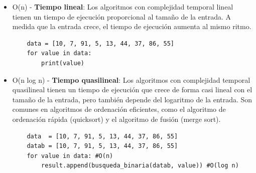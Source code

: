 \documentclass[xcolor=table]{beamer}
\begin{document}
\begin{frame} [fragile] \footnotesize  
    
 \begin{itemize}   

   
       
    \item O(n) - \textbf{Tiempo lineal}: Los algoritmos con complejidad temporal lineal tienen un tiempo de ejecución proporcional al tamaño de la entrada. A medida que la entrada crece, el tiempo de ejecución aumenta al mismo ritmo. 

    \begin{verbatim}
    data = [10, 7, 91, 5, 13, 44, 37, 86, 55]
    for value in data:
        print(value)
    \end{verbatim}

     \item O(n log n) -\textbf{ Tiempo quasilineal}: Los algoritmos con complejidad temporal quasilineal tienen un tiempo de ejecución que crece de forma casi lineal con el tamaño de la entrada, pero también depende del logaritmo de la entrada.  Son comunes en algoritmos de ordenación eficientes, como el algoritmo de ordenación rápida (quicksort) y el algoritmo de fusión (merge sort).

    \begin{verbatim}
    data  = [10, 7, 91, 5, 13, 44, 37, 86, 55]
    datab = [10, 7, 91, 5, 13, 44, 37, 86, 55]
    for value in data: #O(n)
        result.append(busqueda_binaria(datab, value)) #O(log n)
    \end{verbatim}
   
    
\end{itemize}

\end{frame} 
\end{document}
